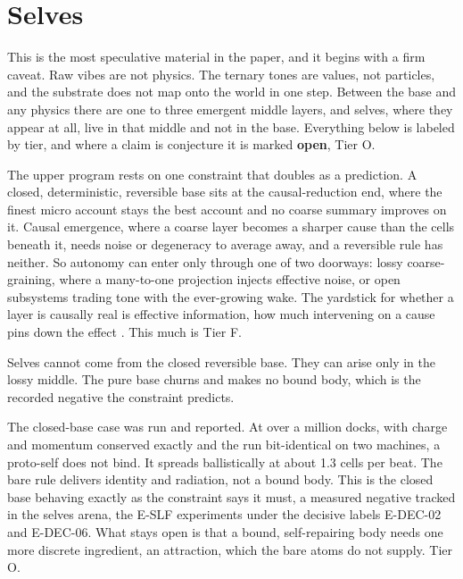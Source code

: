 \section{Selves}

This is the most speculative material in the paper, and it begins with a firm caveat. Raw vibes are not physics. The ternary tones are values, not particles, and the substrate does not map onto the world in one step. Between the base and any physics there are one to three emergent middle layers, and selves, where they appear at all, live in that middle and not in the base. Everything below is labeled by tier, and where a claim is conjecture it is marked \textbf{open}, Tier O.

The upper program rests on one constraint that doubles as a prediction. A closed, deterministic, reversible base sits at the causal-reduction end, where the finest micro account stays the best account and no coarse summary improves on it. Causal emergence, where a coarse layer becomes a sharper cause than the cells beneath it, needs noise or degeneracy to average away, and a reversible rule has neither. So autonomy can enter only through one of two doorways: lossy coarse-graining, where a many-to-one projection injects effective noise, or open subsystems trading tone with the ever-growing wake. The yardstick for whether a layer is causally real is effective information, how much intervening on a cause pins down the effect \cite{hoel2013}. This much is Tier F.

\begin{finding}
Selves cannot come from the closed reversible base. They can arise only in the lossy middle. The pure base churns and makes no bound body, which is the recorded negative the constraint predicts.
\end{finding}

The closed-base case was run and reported. At over a million docks, with charge and momentum conserved exactly and the run bit-identical on two machines, a proto-self does not bind. It spreads ballistically at about 1.3 cells per beat. The bare rule delivers identity and radiation, not a bound body. This is the closed base behaving exactly as the constraint says it must, a measured negative tracked in the selves arena, the E-SLF experiments under the decisive labels E-DEC-02 and E-DEC-06. What stays open is that a bound, self-repairing body needs one more discrete ingredient, an attraction, which the bare atoms do not supply. Tier O.

